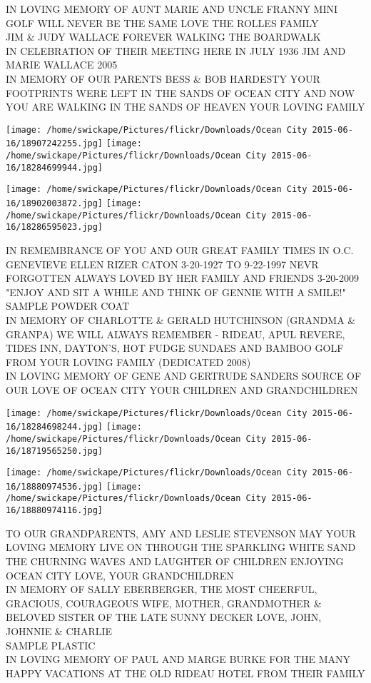 \documentclass[10pt,letterpaper]{article}
\begin{document}
IN LOVING MEMORY OF AUNT MARIE AND UNCLE FRANNY MINI GOLF WILL NEVER BE THE SAME LOVE THE ROLLES FAMILY\\
JIM \& JUDY WALLACE FOREVER WALKING THE BOARDWALK\\
IN CELEBRATION OF THEIR MEETING HERE IN JULY 1936 JIM AND MARIE WALLACE 2005\\
IN MEMORY OF OUR PARENTS BESS \& BOB HARDESTY YOUR FOOTPRINTS WERE LEFT IN THE SANDS OF OCEAN CITY AND NOW YOU ARE WALKING IN THE SANDS OF HEAVEN YOUR LOVING FAMILY
\pagebreak

\texttt{[image: /home/swickape/Pictures/flickr/Downloads/Ocean City 2015-06-16/18907242255.jpg]}
\texttt{[image: /home/swickape/Pictures/flickr/Downloads/Ocean City 2015-06-16/18284699944.jpg]}

\texttt{[image: /home/swickape/Pictures/flickr/Downloads/Ocean City 2015-06-16/18902003872.jpg]}
\texttt{[image: /home/swickape/Pictures/flickr/Downloads/Ocean City 2015-06-16/18286595023.jpg]}

IN REMEMBRANCE OF YOU AND OUR GREAT FAMILY TIMES IN O.C. GENEVIEVE ELLEN RIZER CATON 3{-}20{-}1927 TO 9{-}22{-}1997 NEVR FORGOTTEN ALWAYS LOVED BY HER FAMILY AND FRIENDS 3{-}20{-}2009 "ENJOY AND SIT A WHILE AND THINK OF GENNIE WITH A SMILE!"\\
SAMPLE POWDER COAT\\
IN MEMORY OF CHARLOTTE \& GERALD HUTCHINSON (GRANDMA \& GRANPA) WE WILL ALWAYS REMEMBER {-} RIDEAU, APUL REVERE, TIDES INN, DAYTON'S, HOT FUDGE SUNDAES AND BAMBOO GOLF FROM YOUR LOVING FAMILY (DEDICATED 2008)\\
IN LOVING MEMORY OF GENE AND GERTRUDE SANDERS SOURCE OF OUR LOVE OF OCEAN CITY YOUR CHILDREN AND GRANDCHILDREN
\pagebreak

\texttt{[image: /home/swickape/Pictures/flickr/Downloads/Ocean City 2015-06-16/18284698244.jpg]}
\texttt{[image: /home/swickape/Pictures/flickr/Downloads/Ocean City 2015-06-16/18719565250.jpg]}

\texttt{[image: /home/swickape/Pictures/flickr/Downloads/Ocean City 2015-06-16/18880974536.jpg]}
\texttt{[image: /home/swickape/Pictures/flickr/Downloads/Ocean City 2015-06-16/18880974116.jpg]}

TO OUR GRANDPARENTS, AMY AND LESLIE STEVENSON MAY YOUR LOVING MEMORY LIVE ON THROUGH THE SPARKLING WHITE SAND THE CHURNING WAVES AND LAUGHTER OF CHILDREN ENJOYING OCEAN CITY LOVE, YOUR GRANDCHILDREN\\
IN MEMORY OF SALLY EBERBERGER, THE MOST CHEERFUL, GRACIOUS, COURAGEOUS WIFE, MOTHER, GRANDMOTHER \& BELOVED SISTER OF THE LATE SUNNY DECKER LOVE, JOHN, JOHNNIE \& CHARLIE\\
SAMPLE PLASTIC\\
IN LOVING MEMORY OF PAUL AND MARGE BURKE FOR THE MANY HAPPY VACATIONS AT THE OLD RIDEAU HOTEL FROM THEIR FAMILY
\pagebreak
\end{document}
